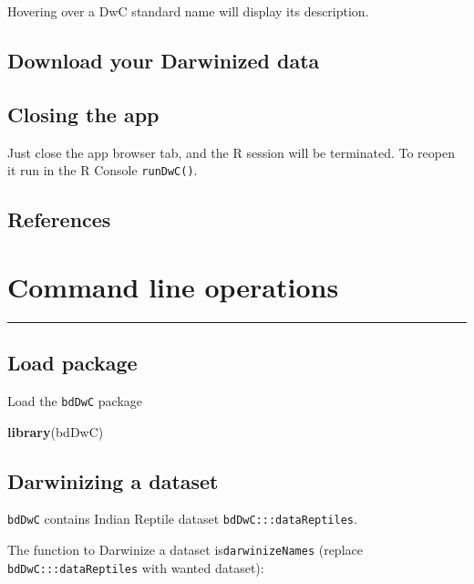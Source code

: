\documentclass[]{book}
\newenvironment{Shaded}{\begin{snugshade}}{\end{snugshade}}
\newcommand{\KeywordTok}[1]{\textcolor[rgb]{0.13,0.29,0.53}{\textbf{#1}}}
\newcommand{\NormalTok}[1]{#1}
\theoremstyle{definition}
\theoremstyle{definition}
\theoremstyle{definition}
\theoremstyle{remark}
\begin{document}
Hovering over a DwC standard name will display its description.

\section{Download your Darwinized
data}\label{download-your-darwinized-data}

\section{Closing the app}\label{closing-the-app}

Just close the app browser tab, and the R session will be terminated. To
reopen it run in the R Console \texttt{runDwC()}.

\section{References}\label{references}

\chapter{Command line operations}\label{command-line-operations}

\begin{center}\rule{0.5\linewidth}{\linethickness}\end{center}

\section{Load package}\label{load-package}

Load the \texttt{bdDwC} package

\begin{Shaded}
\begin{Highlighting}[]
    \KeywordTok{library}\NormalTok{(bdDwC)}
\end{Highlighting}
\end{Shaded}

\section{Darwinizing a dataset}\label{darwinizing-a-dataset}

\texttt{bdDwC} contains Indian Reptile dataset
\texttt{bdDwC:::dataReptiles}.

The function to Darwinize a dataset is\texttt{darwinizeNames} (replace
\texttt{bdDwC:::dataReptiles} with wanted dataset):
\end{document}
